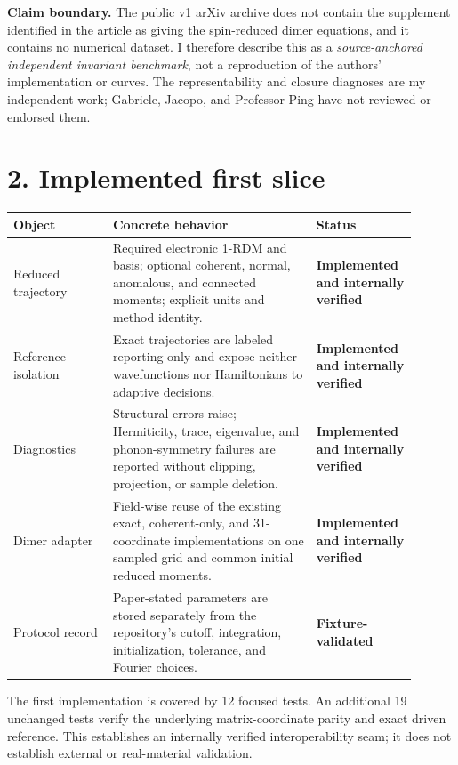 \documentclass[11pt]{article}
\newcommand{\implemented}{\textcolor{statusgreen}{\textbf{Implemented and internally verified}}}
\newcommand{\fixturevalidated}{\textcolor{statusamber}{\textbf{Fixture-validated}}}
\begin{document}
\textbf{Claim boundary.} The public v1 arXiv archive does not contain the
supplement identified in the article as giving the spin-reduced dimer
equations, and it contains no numerical dataset. I therefore describe this as
a \emph{source-anchored independent invariant benchmark}, not a reproduction
of the authors' implementation or curves. The representability and closure
diagnoses are my independent work; Gabriele, Jacopo, and Professor Ping have
not reviewed or endorsed them.

\section*{2. Implemented first slice}

\begin{tabular}{p{0.23\linewidth}p{0.47\linewidth}p{0.20\linewidth}}
\toprule
Object & Concrete behavior & Status \\
\midrule
Reduced trajectory & Required electronic 1-RDM and basis; optional coherent,
normal, anomalous, and connected moments; explicit units and method identity.
& \implemented \\
\addlinespace
Reference isolation & Exact trajectories are labeled reporting-only and expose
neither wavefunctions nor Hamiltonians to adaptive decisions.
& \implemented \\
\addlinespace
Diagnostics & Structural errors raise; Hermiticity, trace, eigenvalue, and
phonon-symmetry failures are reported without clipping, projection, or sample
deletion.
& \implemented \\
\addlinespace
Dimer adapter & Field-wise reuse of the existing exact, coherent-only, and
31-coordinate implementations on one sampled grid and common initial reduced
moments.
& \implemented \\
\addlinespace
Protocol record & Paper-stated parameters are stored separately from the
repository's cutoff, integration, initialization, tolerance, and Fourier
choices.
& \fixturevalidated \\
\bottomrule
\end{tabular}

The first implementation is covered by 12 focused tests. An additional 19
unchanged tests verify the underlying matrix-coordinate parity and exact driven
reference. This establishes an internally verified interoperability seam; it
does not establish external or real-material validation.

\begin{center}
\end{center}
\end{document}
